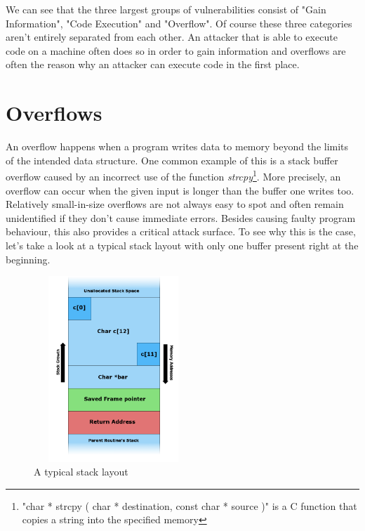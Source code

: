 \documentclass[10pt,twocolumn,a4paper]{article}
\begin{document}
We can see that the three largest groups of vulnerabilities consist of "Gain Information", "Code Execution" and "Overflow".
Of course these three categories aren't entirely separated from each other.
An attacker that is able to execute code on a machine often does so in order to gain information and overflows are often the reason why an attacker can execute code in the first place.
\section{Overflows}\label{sec:Overflows}
An overflow happens when a program writes data to memory beyond the limits of the intended data structure.
One common example of this is a stack buffer overflow caused by an incorrect use of the function \emph{strcpy}\footnote{"char * strcpy ( char * destination, const char * source )" is a C function that copies a string into the specified memory}.
More precisely, an overflow can occur when the given input is longer than the buffer one writes too.
Relatively small-in-size overflows are not always easy to spot and often remain unidentified if they don't cause immediate errors.
Besides causing faulty program behaviour, this also provides a critical attack surface.
To see why this is the case, let's take a look at a typical stack layout with only one buffer present right at the beginning.
\begin{figure}[htbp]
	\begin{center}
		\includegraphics[height=7cm,width=6cm]{fig/Stack_Overflow}
		\caption{A typical stack layout}
	\end{center}
\end{figure}
\newline
\end{document}
